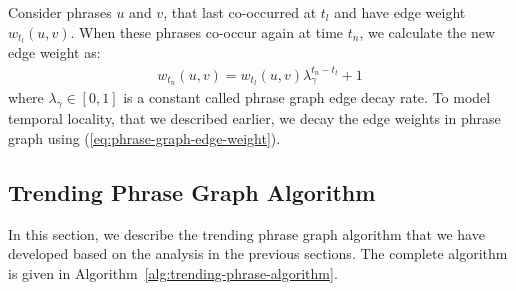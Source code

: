 \documentclass{sig-alternate}
\begin{document}
Consider phrases $u$ and $v$, that last co-occurred at $t_l$ and have edge weight  $w_{t_l}(u, v)$. When these phrases co-occur again at time $t_n$, we calculate the new edge weight as:
\begin{align}
w_{t_n}(u, v) = w_{t_l}(u, v)\lambda_{\gamma}^{t_n-t_l  } + 1  
\label{eq:phrase-graph-edge-weight}
\end{align}
\noindent where $\lambda_{\gamma} \in [0, 1]$ is a constant called phrase graph edge decay rate. To model temporal locality, that we described earlier, we decay the edge weights in phrase graph using (\ref{eq:phrase-graph-edge-weight}).


\subsection{Trending Phrase Graph Algorithm}

In this section, we describe the trending phrase graph algorithm that we have developed based on the analysis in the previous sections. The complete algorithm is given in Algorithm~\ref{alg:trending-phrase-algorithm}.
\end{document}
